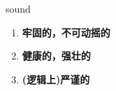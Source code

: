 
\begin{frame}
{\huge sound}
\begin{center}
\begin{enumerate}\Large
  \item \textbf{牢固的，不可动摇的}
  \item \textbf{健康的，强壮的}
  \item \textbf{(逻辑上)严谨的}
\end{enumerate}
\end{center}
\end{frame}
